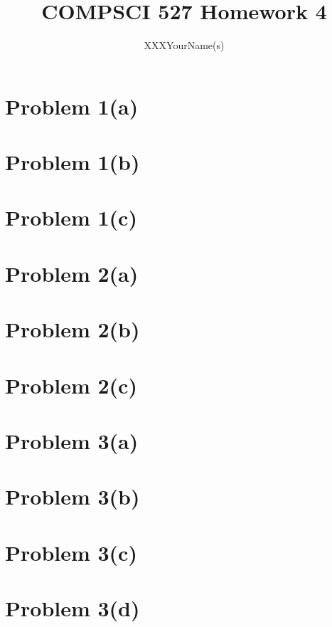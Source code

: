 \documentclass{article}
\author{XXXYourName(s)}
\title{COMPSCI 527 Homework 4}
\begin{document}
\maketitle

\section*{Problem 1(a)}

\section*{Problem 1(b)}

\section*{Problem 1(c)}

\section*{Problem 2(a)}

\section*{Problem 2(b)}

\section*{Problem 2(c)}

\section*{Problem 3(a)}

\section*{Problem 3(b)}

\section*{Problem 3(c)}

\section*{Problem 3(d)}
\end{document}
